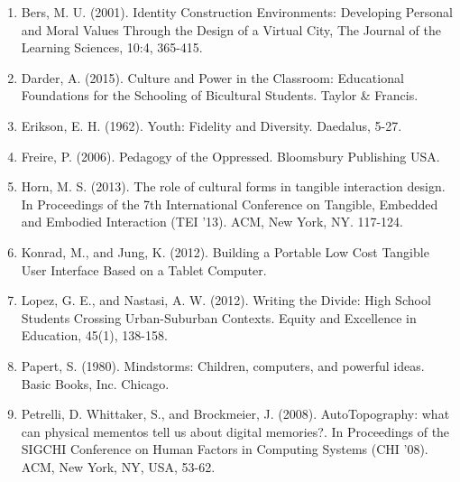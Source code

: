 \documentclass{sigchi-ext}
\begin{document}
\begin{enumerate}\compresslist


	\item Bers, M. U. (2001). Identity Construction Environments: Developing Personal and Moral Values Through the Design of a Virtual City, The Journal of the Learning Sciences, 10:4, 365-415.



	\item Darder, A. (2015). Culture and Power in the Classroom: Educational Foundations for the Schooling of Bicultural Students. Taylor \& Francis.

	\item Erikson, E. H. (1962). Youth: Fidelity and Diversity. Daedalus, 5-27.

	\item Freire, P. (2006). Pedagogy of the Oppressed. Bloomsbury Publishing USA.

	\item Horn, M. S. (2013). The role of cultural forms in tangible interaction design. In Proceedings of the 7th International Conference on Tangible, Embedded and Embodied Interaction (TEI '13). ACM, New York, NY. 117-124. 

	\item Konrad, M., and Jung, K. (2012). Building a Portable Low Cost Tangible User Interface Based on a Tablet Computer.

	\item Lopez, G. E., and Nastasi, A. W. (2012). Writing the Divide: High School Students Crossing Urban-Suburban Contexts. Equity and Excellence in Education, 45(1), 138-158.		

	\item Papert, S. (1980). Mindstorms: Children, computers, and powerful ideas. Basic Books, Inc. Chicago.

	\item Petrelli, D. Whittaker, S., and Brockmeier, J. (2008). AutoTopography: what can physical mementos tell us about digital memories?. In Proceedings of the SIGCHI Conference on Human Factors in Computing Systems (CHI '08). ACM, New York, NY, USA, 53-62.
\end{enumerate}

%
%
\end{document}
